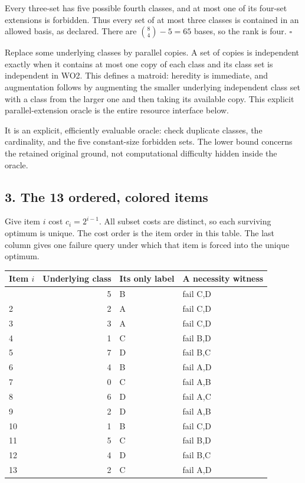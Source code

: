 Every three-set has five possible fourth classes, and at most one of its four-set extensions is forbidden. Thus every set of at most three classes is contained in an allowed basis, as declared. There are \(\binom84-5=65\) bases, so the rank is four. \(\square\)

Replace some underlying classes by parallel copies. A set of copies is independent exactly when it contains at most one copy of each class and its class set is independent in WO2. This defines a matroid: heredity is immediate, and augmentation follows by augmenting the smaller underlying independent class set with a class from the larger one and then taking its available copy. This explicit parallel-extension oracle is the entire resource interface below.

It is an explicit, efficiently evaluable oracle: check duplicate classes, the cardinality, and the five constant-size forbidden sets. The lower bound concerns the retained original ground, not computational difficulty hidden inside the oracle.

\hypertarget{af-f44144c751-the-13-ordered-colored-items}{%
\subsection{3. The 13 ordered, colored items}\label{af-f44144c751-the-13-ordered-colored-items}}

Give item \(i\) cost \(c_i=2^{i-1}\). All subset costs are distinct, so each surviving optimum is unique. The cost order is the item order in this table. The last column gives one failure query under which that item is forced into the unique optimum.

\begin{longtable}[]{@{}lrll@{}}
\toprule\noalign{}
Item \(i\) & Underlying class & Its only label & A necessity witness \\
\midrule\noalign{}
\endhead
\bottomrule\noalign{}
\endlastfoot
1 & 5 & B & fail C,D \\
2 & 2 & A & fail C,D \\
3 & 3 & A & fail C,D \\
4 & 1 & C & fail B,D \\
5 & 7 & D & fail B,C \\
6 & 4 & B & fail A,D \\
7 & 0 & C & fail A,B \\
8 & 6 & D & fail A,C \\
9 & 2 & D & fail A,B \\
10 & 1 & B & fail C,D \\
11 & 5 & C & fail B,D \\
12 & 4 & D & fail B,C \\
13 & 2 & C & fail A,D \\
\end{longtable}


